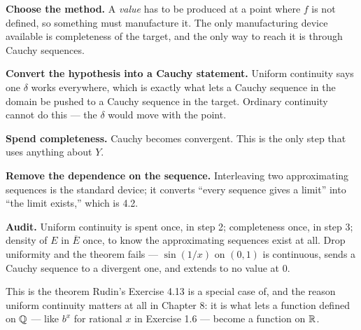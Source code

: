 \begin{proofwalk}
  \item \textbf{Choose the method.} A \emph{value} has to be produced at a
        point where $f$ is not defined, so something must manufacture it.
        The only manufacturing device available is completeness of the
        target, and the only way to reach it is through Cauchy sequences.
  \item \textbf{Convert the hypothesis into a Cauchy statement.} Uniform
        continuity says one $\delta$ works everywhere, which is exactly what
        lets a Cauchy sequence in the domain be pushed to a Cauchy sequence
        in the target. Ordinary continuity cannot do this --- the $\delta$
        would move with the point.
  \item \textbf{Spend completeness.} Cauchy becomes convergent. This is the
        only step that uses anything about $Y$.
  \item \textbf{Remove the dependence on the sequence.} Interleaving two
        approximating sequences is the standard device; it converts ``every
        sequence gives a limit'' into ``the limit exists,'' which is 4.2.
  \item \textbf{Audit.} Uniform continuity is spent once, in step 2;
        completeness once, in step 3; density of $E$ in $\overline E$ once,
        to know the approximating sequences exist at all. Drop uniformity and
        the theorem fails --- $\sin(1/x)$ on $(0,1)$ is continuous, sends a
        Cauchy sequence to a divergent one, and extends to no value at $0$.
\end{proofwalk}

\noindent
This is the theorem Rudin's Exercise 4.13 is a special case of, and the
reason uniform continuity matters at all in Chapter 8: it is what lets a
function defined on $\mathbb{Q}$ --- like $b^x$ for rational $x$ in Exercise 1.6 ---
become a function on $\mathbb{R}$.

